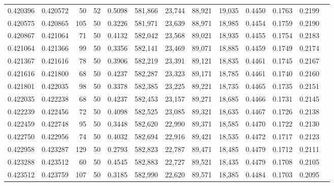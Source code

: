 \begin{tabular}{rrrrrrrrrrrrr}
0.420396 & 0.420572 &    50 &  52 &                                     0.5098 & 581,866 &  23,744 &  88,921 &  19,035 & 0.4450 & 0.1763 & 0.2199 \\
0.420575 & 0.420865 &   105 &  50 &                                     0.3226 & 581,971 &  23,639 &  88,971 &  18,985 & 0.4454 & 0.1759 & 0.2190 \\
0.420867 & 0.421064 &    71 &  50 &                                     0.4132 & 582,042 &  23,568 &  89,021 &  18,935 & 0.4455 & 0.1754 & 0.2183 \\
0.421064 & 0.421366 &    99 &  50 &                                     0.3356 & 582,141 &  23,469 &  89,071 &  18,885 & 0.4459 & 0.1749 & 0.2174 \\
0.421367 & 0.421616 &    78 &  50 &                                     0.3906 & 582,219 &  23,391 &  89,121 &  18,835 & 0.4461 & 0.1745 & 0.2167 \\
0.421616 & 0.421800 &    68 &  50 &                                     0.4237 & 582,287 &  23,323 &  89,171 &  18,785 & 0.4461 & 0.1740 & 0.2160 \\
0.421801 & 0.422035 &    98 &  50 &                                     0.3378 & 582,385 &  23,225 &  89,221 &  18,735 & 0.4465 & 0.1735 & 0.2151 \\
0.422035 & 0.422238 &    68 &  50 &                                     0.4237 & 582,453 &  23,157 &  89,271 &  18,685 & 0.4466 & 0.1731 & 0.2145 \\
0.422239 & 0.422456 &    72 &  50 &                                     0.4098 & 582,525 &  23,085 &  89,321 &  18,635 & 0.4467 & 0.1726 & 0.2138 \\
0.422459 & 0.422748 &    95 &  50 &                                     0.3448 & 582,620 &  22,990 &  89,371 &  18,585 & 0.4470 & 0.1722 & 0.2130 \\
0.422750 & 0.422956 &    74 &  50 &                                     0.4032 & 582,694 &  22,916 &  89,421 &  18,535 & 0.4472 & 0.1717 & 0.2123 \\
0.422958 & 0.423287 &   129 &  50 &                                     0.2793 & 582,823 &  22,787 &  89,471 &  18,485 & 0.4479 & 0.1712 & 0.2111 \\
0.423288 & 0.423512 &    60 &  50 &                                     0.4545 & 582,883 &  22,727 &  89,521 &  18,435 & 0.4479 & 0.1708 & 0.2105 \\
0.423512 & 0.423759 &   107 &  50 &                                     0.3185 & 582,990 &  22,620 &  89,571 &  18,385 & 0.4484 & 0.1703 & 0.2095 \\

\end{tabular}
